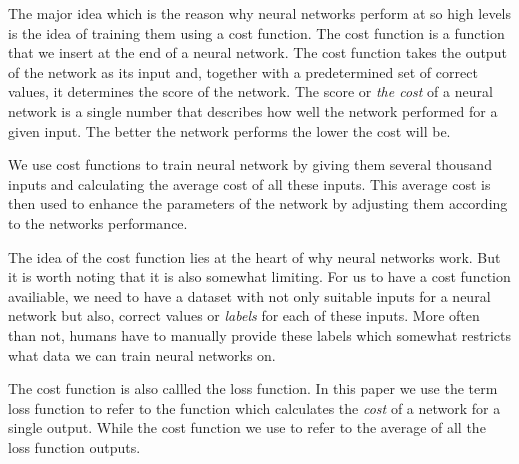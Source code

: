The major idea which is the reason why neural networks perform at so high levels is the idea of training them using a cost function.
The cost function is a function that we insert at the end of a neural network.
The cost function takes the output of the network as its input and, together with a predetermined set of correct values, it determines the score of the network.
The score or {\em the cost} of a neural network is a single number that describes how well the network performed for a given input.
The better the network performs the lower the cost will be.

We use cost functions to train neural network by giving them several thousand inputs and calculating the average cost of all these inputs.
This average cost is then used to enhance the parameters of the network by adjusting them according to the networks performance.

The idea of the cost function lies at the heart of why neural networks work.
But it is worth noting that it is also somewhat limiting.
For us to have a cost function availiable, we need to have a dataset with not only suitable inputs for a neural network but also, correct values or {\em labels} for each of these inputs.
More often than not, humans have to manually provide these labels which somewhat restricts what data we can train neural networks on.

The cost function is also callled the loss function.
In this paper we use the term loss function to refer to the function which calculates the {\em cost} of a network for a single output.
While the cost function we use to refer to the average of all the loss function outputs.